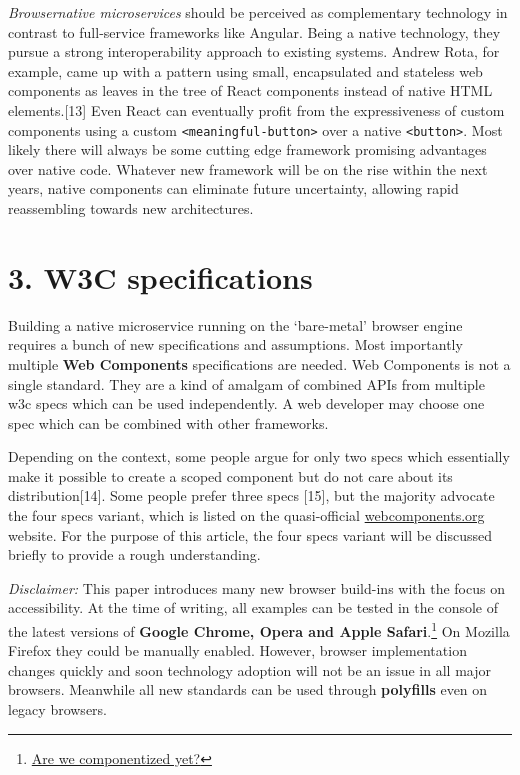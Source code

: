 \documentclass[]{article}
\begin{document}
\emph{Browsernative microservices} should be perceived as complementary
technology in contrast to full-service frameworks like Angular. Being a
native technology, they pursue a strong interoperability approach to
existing systems. Andrew Rota, for example, came up with a pattern using
small, encapsulated and stateless web components as leaves in the tree
of React components instead of native HTML elements.{[}13{]} Even React
can eventually profit from the expressiveness of custom components using
a custom \texttt{\textless{}meaningful-button\textgreater{}} over a
native \texttt{\textless{}button\textgreater{}}. Most likely there will
always be some cutting edge framework promising advantages over native
code. Whatever new framework will be on the rise within the next years,
native components can eliminate future uncertainty, allowing rapid
reassembling towards new architectures.

\section{3. W3C specifications}\label{w3c-specifications}

Building a native microservice running on the `bare-metal' browser
engine requires a bunch of new specifications and assumptions. Most
importantly multiple \textbf{Web Components} specifications are needed.
Web Components is not a single standard. They are a kind of amalgam of
combined APIs from multiple w3c specs which can be used independently. A
web developer may choose one spec which can be combined with other
frameworks.

Depending on the context, some people argue for only two specs which
essentially make it possible to create a scoped component but do not
care about its distribution{[}14{]}. Some people prefer three specs
{[}15{]}, but the majority advocate the four specs variant, which is
listed on the quasi-official
\href{http://webcomponents.org}{webcomponents.org} website. For the
purpose of this article, the four specs variant will be discussed
briefly to provide a rough understanding.

\emph{Disclaimer:} This paper introduces many new browser build-ins with
the focus on accessibility. At the time of writing, all examples can be
tested in the console of the latest versions of \textbf{Google Chrome,
Opera and Apple Safari}.\footnote{\href{http://jonrimmer.github.io/are-we-componentized-yet/}{Are
  we componentized yet?}} On Mozilla Firefox they could be manually
enabled. However, browser implementation changes quickly and soon
technology adoption will not be an issue in all major browsers.
Meanwhile all new standards can be used through \textbf{polyfills} even
on legacy browsers.
\end{document}

